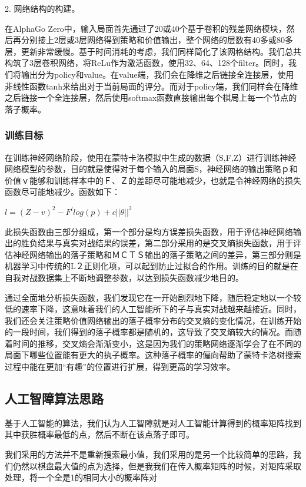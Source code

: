 \documentclass[a4paper]{article}
\begin{document}
\begin{multicols}{2}
2. 网络结构的构建。\par
在AlphaGo Zero中，输入局面首先通过了20或40个基于卷积的残差网络模块，然后再分别接上2层或3层网络得到策略和价值输出，整个网络的层数有40多或80多层，更新非常缓慢。\cite{AI2}基于时间消耗的考虑，我们同样简化了该网格结构。我们总共构筑了3层卷积网络，将ReLu作为激活函数，使用32、64、128个filter。同时，我们将输出分为policy和value。在value端，我们会在降维之后链接全连接层，使用非线性函数tanh来给出对于当前局面的评分。而对于policy端，我们同样会在降维之后链接一个全连接层，然后使用softmax函数直接输出每个棋局上每一个节点的落子概率。\par
\subsubsection{训练目标}
	在训练神经网络阶段，使用在蒙特卡洛模拟中生成的数据（S,F,Z）进行训练神经网络模型的参数，目的就是使得对于每个输入的局面S，神经网络的输出策略ｐ和价值ｖ能够和训练样本中的Ｆ、Ｚ的差距尽可能地减少，也就是令神经网络的损失函数尽可能地减少。函数如下：\par
$l=(Z-v)^{2}-F^{l}log(p)+c||\theta||^{2}$\par
此损失函数由三部分组成，第一个部分是均方误差损失函数，用于评估神经网络输出的胜负结果与真实对战结果的误差，第二部分采用的是交叉熵损失函数，用于评估神经网络输出的落子策略和ＭＣＴＳ输出的落子策略之间的差异，第三部分则是机器学习中传统的L２正则化项，可以起到防止过拟合的作用。训练的目的就是在自我对战数据集上不断地调整参数，以达到损失函数减少地目的。\cite{k9}\par
通过全面地分析损失函数，我们发现它在一开始剧烈地下降，随后稳定地以一个较低的速率下降，这意味着我们的人工智能所下的子与真实对战越来越接近。同时，我们还会关注策略价值网络输出的落子概率分布的交叉熵的变化情况，在训练开始的一段时间，我们得到的落子概率都是随机的，这导致了交叉熵较大的情况。而随着时间的推移，交叉熵会渐渐变小，这是因为我们的策略网络逐渐学会了在不同的局面下哪些位置能有更大的执子概率。这种落子概率的偏向帮助了蒙特卡洛树搜索过程中能在更加“有趣”的位置进行扩展，得到更高的学习效率。\par
\subsection{人工智障算法思路}
基于人工智能的算法，我们认为人工智障就是对人工智能计算得到的概率矩阵找到其中获胜概率最低的点，然后不断在该点落子即可。\par
我们采用的方法并不是重新搜索最小值，我们采用的是另一个比较简单的思路，我们仍然以棋盘最大值的点为选择，但是我我们在传入概率矩阵的时候，对矩阵采取处理，将一个全是1的相同大小的概率阵对





\end{multicols}
\end{document}
